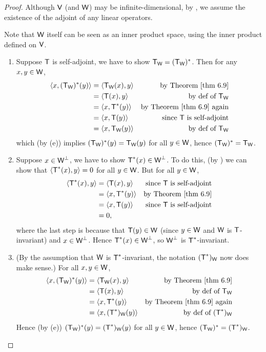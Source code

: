 \begin{proof}
Although \(\textsf{V}\) (and \(\textsf{W}\)) may be infinite-dimensional, by , we assume the existence of the adjoint of any linear operators.

Note that \(\textsf{W}\) itself can be seen as an inner product space, using the inner product defined on \(\textsf{V}\).
\begin{enumerate}
\item Suppose \(\textsf{T}\) is self-adjoint, we have to show \(\textsf{T}_{\textsf{W}} = (\textsf{T}_{\textsf{W}})^*\).
Then for any \(x, y \in \textsf{W}\),
\begin{align*}
    \LG x, (\T_\W)^*(y) \RG & = \LG \T_\W(x), y \RG & \text{by \THM{6.9}} \\
        & = \LG \T(x), y \RG & \text{by def of \(\T_\W\)} \\
        & = \LG x, \T^*(y) \RG & \text{by \THM{6.9} again} \\
        & = \LG x, \T(y) \RG & \text{since \(\T\) is self-adjoint} \\
        & = \LG x, \T_\W(y) \RG & \text{by def of \(\T_\W\)}
\end{align*}
which (by (e)) implies \((\textsf{T}_{\textsf{W}})^*(y) = \textsf{T}_{\textsf{W}}(y)\) for all \(y \in \textsf{W}\), hence \((\textsf{T}_{\textsf{W}})^* = \textsf{T}_{\textsf{W}}\).

\item Suppose \(x \in \textsf{W}^{\perp}\), we have to show \(\textsf{T}^*(x) \in \textsf{W}^{\perp}\).
To do this, (by ) we can show that \(\left< \textsf{T}^*(x), y \right> = 0\) for all \(y \in \textsf{W}\).
But for all \(y \in \textsf{W}\),
\begin{align*}
    \LG \T^*(x), y \RG & = \LG \T(x), y \RG & \text{since \(\T\) is self-adjoint} \\
        & = \LG x, \T^*(y) \RG & \text{by \THM{6.9}} \\
        & = \LG x, \T(y) \RG & \text{since \(\T\) is self-adjoint} \\
        & = 0, &
\end{align*}
where the last step is because that \(\textsf{T}(y) \in \textsf{W}\) (since \(y \in \textsf{W}\) and \(\textsf{W}\) is \(\textsf{T}\)-invariant) and \(x \in \textsf{W}^{\perp}\).
Hence \(\textsf{T}^*(x) \in \textsf{W}^{\perp}\), so \(\textsf{W}^{\perp}\) is \(\textsf{T}^*\)-invariant.

\item (By the assumption that \(\textsf{W}\) is \(\textsf{T}^*\)-invariant, the notation \((\textsf{T}^*)_{\textsf{W}}\) now does make sense.)
For all \(x, y \in \textsf{W}\),
\begin{align*}
    \LG x, (\T_\W)^*(y) \RG & = \LG \T_\W(x), y \RG & \text{by \THM{6.9}} \\
        & = \LG \T(x), y \RG & \text{by def of \(\T_\W\)} \\
        & = \LG x, \T^*(y) \RG & \text{by \THM{6.9} again} \\
        & = \LG x, (\T^*)_\W(y) \RG & \text{by def of \((\T^*)_\W\)}
\end{align*}
Hence (by (e)) \((\textsf{T}_{\textsf{W}})^*(y) = (\textsf{T}^*)_{\textsf{W}}(y)\) for all \(y \in \textsf{W}\), hence \((\textsf{T}_{\textsf{W}})^* = (\textsf{T}^*)_{\textsf{W}}\).


\end{enumerate}
\end{proof}
